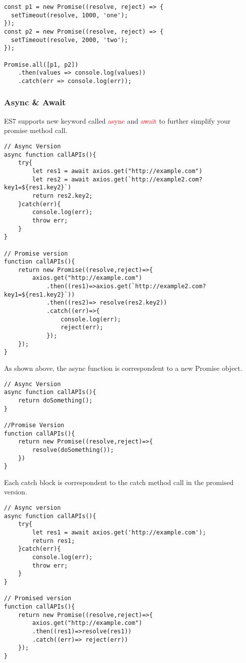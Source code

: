 \documentclass[a4paper]{article}
\begin{document}
\begin{lstlisting}
const p1 = new Promise((resolve, reject) => {
  setTimeout(resolve, 1000, 'one');
});
const p2 = new Promise((resolve, reject) => {
  setTimeout(resolve, 2000, 'two');
});

Promise.all([p1, p2])
    .then(values => console.log(values))
    .catch(err => console.log(err));
\end{lstlisting}
\subsubsection{Async \& Await}
ES7 supports new keyword called \textcolor{red}{async} and \textcolor{red}{await} to further simplify your promise method call.

\begin{lstlisting}
// Async Version 
async function callAPIs(){
    try{
        let res1 = await axios.get("http://example.com")
        let res2 = await axios.get(`http://example2.com?key1=${res1.key2}`)
        return res2.key2;
    }catch(err){
        console.log(err);
        throw err;
    }
}

// Promise version
function callAPIs(){
    return new Promise((resolve,reject)=>{
        axios.get("http://example.com")
            .then((res1)=>axios.get(`http://example2.com?key1=${res1.key2}`))
            .then((res2)=> resolve(res2.key2))
            .catch((err)=>{
                console.log(err);
                reject(err);
            });            
    });
}
\end{lstlisting}
As shown above, the async function is correspondent to a new Promise object.
\begin{lstlisting}
// Async Version
async function callAPIs(){
    return doSomething();
}

//Promise Version
function callAPIs(){
    return new Promise((resolve,reject)=>{
        resolve(doSomething());
    })
}
\end{lstlisting}
Each catch block is correspondent to the catch method call in the promised version.

\begin{lstlisting}
// Async version
async function callAPIs(){
    try{
        let res1 = await axios.get('http://example.com');
        return res1;
    }catch(err){
        console.log(err);
        throw err;
    }
}

// Promised version
function callAPIs(){
    return new Promise((resolve,reject)=>{
        axios.get("http://example.com")
        .then((res1)=>resolve(res1))
        .catch((err)=> reject(err))
    });
}
\end{lstlisting}
\end{document}
